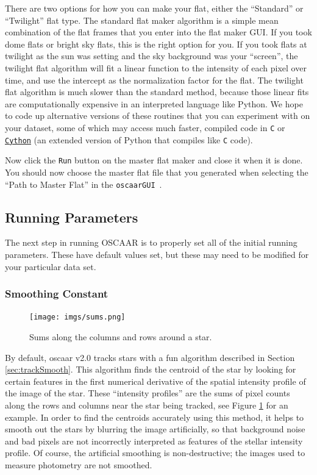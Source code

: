 \documentclass[a4paper]{article}
\newcommand{\code}[1]{\texttt{#1}}
\newcommand{\gui}{\code{oscaarGUI}~}
\begin{document}
There are two options for how you can make your flat, either  the ``Standard'' or ``Twilight'' flat type. The standard flat maker algorithm is a simple mean combination of the flat frames that you enter into the flat maker GUI. If you took dome flats or bright sky flats, this is the right option for you. If you took flats at twilight as the sun was setting and the sky background was your ``screen'', the twilight flat algorithm will fit a linear function to the intensity of each pixel over time, and use the intercept as the normalization factor for the flat. The twilight flat algorithm is much slower than the standard method, because those linear fits are computationally expensive in an interpreted language like Python. We hope to code up alternative versions of these routines that you can experiment with on your dataset, some of which may access much faster, compiled code in \code{C} or \code{\href{http://cython.org/}{Cython}} (an extended version of Python that compiles like \code{C} code).

Now click the \code{Run} button on the master flat maker and close it when it is done. You should now choose the master flat file that you generated when selecting the ``Path to Master Flat'' in the \gui. 

\subsection{Running Parameters}
The next step in running OSCAAR is to properly set all of the initial running parameters. These have default values set, but these may need to be modified for your particular data set.

\subsubsection{Smoothing Constant} \label{sec:smoothingconst}
\begin{figure}[H]
\begin{center}
\texttt{[image: imgs/sums.png]}
\caption{Sums along the columns and rows around a star.}
\label{fig:sumsExample}
\end{center}	
\end{figure}
By default, oscaar v2.0 tracks stars with a fun algorithm described in Section \ref{sec:trackSmooth}. This algorithm finds the centroid of the star by looking for certain features in the first numerical derivative of the spatial intensity profile of the image of the star. These ``intensity profiles'' are the sums of pixel counts along the rows and columns near the star being tracked, see Figure \ref{fig:sumsExample} for an example. In order to find the centroids accurately using this method, it helps to smooth out the stars by blurring the image artificially, so that background noise and bad pixels are not incorrectly  interpreted as features of the stellar intensity profile. Of course, the artificial smoothing is non-destructive; the images used to measure photometry are not smoothed. 
\end{document}
